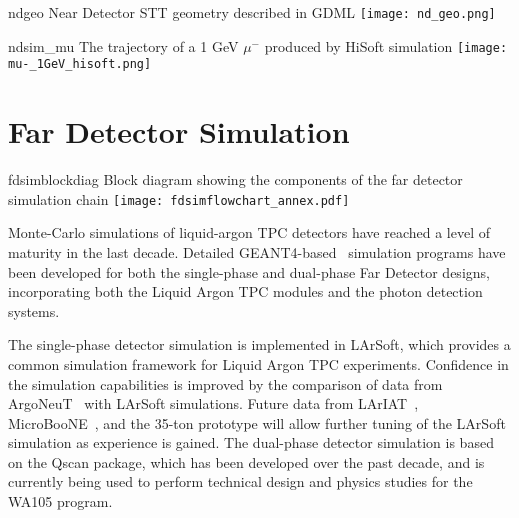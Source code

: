 \begin{cdrfigure}{ndgeo}
{Near Detector STT geometry described in GDML}
\texttt{[image: nd\_geo.png]}
\end{cdrfigure}

\begin{cdrfigure}{ndsim_mu}
{The trajectory of a 1 GeV $\mu^-$ produced by HiSoft simulation}
\texttt{[image: mu-\_1GeV\_hisoft.png]}
\end{cdrfigure}

\section{Far Detector Simulation}
\label{annex:detectors-sc-physics-software-simulation-fd}

\begin{cdrfigure}{fdsimblockdiag}
{Block diagram showing the components of the far detector simulation chain}
\texttt{[image: fdsimflowchart\_annex.pdf]}
\end{cdrfigure}

Monte-Carlo simulations of liquid-argon TPC detectors have reached a level of maturity
in the last decade.  Detailed GEANT4-based~\cite{GEANT4:NIM,GEANT4} simulation
programs have been developed  for both the single-phase and dual-phase Far Detector designs,
incorporating both the Liquid Argon TPC modules and the photon detection systems.   

The single-phase detector simulation is implemented in LArSoft,
which provides a common simulation framework for Liquid Argon TPC experiments.
Confidence in the simulation capabilities is improved by
the comparison of data from ArgoNeuT~\cite{Adamson:2013/02/28tla,argoneut-url,Acciarri:2013met,Anderson:2012mra} with LArSoft
simulations.  Future data from LArIAT~\cite{Adamson:2013/02/28tla,Cavanna:2014iqa},
MicroBooNE~\cite{Chen:2007ae,Jones:2011ci,microboonecdr}, and the 35-ton prototype will allow
further tuning of the LArSoft simulation as experience is gained.
The dual-phase detector simulation is based on the Qscan package,
which has been developed over the past decade, and is currently
being used to perform technical design and physics studies for
the WA105 program.

